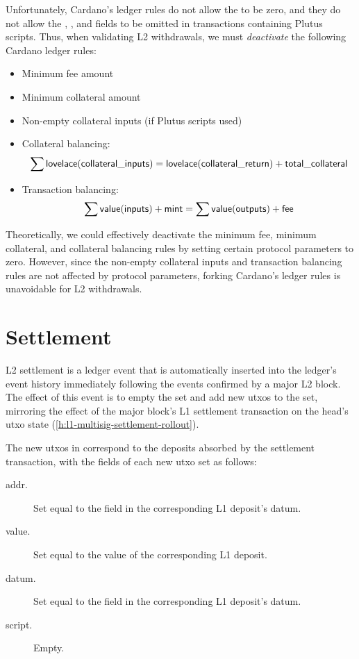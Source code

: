 \documentclass[../hydrozoa.tex]{subfiles}
\begin{document}
Unfortunately, Cardano's ledger rules do not allow the  to be zero, and they do not allow the , , and  fields to be omitted in transactions containing Plutus scripts.
Thus, when validating L2 withdrawals, we must \emph{deactivate} the following Cardano ledger rules:
\begin{itemize}
  \item Minimum fee amount
  \item Minimum collateral amount
  \item Non-empty collateral inputs (if Plutus scripts used)
  \item Collateral balancing:
    \begin{equation*}
      \sum \mathsf{lovelace} (\mathsf{collateral\_inputs}) =
      \mathsf{lovelace} (\mathsf{collateral\_return}) + \mathsf{total\_collateral}
    \end{equation*}
  \item Transaction balancing:
    \begin{equation*}
      \sum \mathsf{value} (\mathsf{inputs}) + \mathsf{mint} =
      \sum \mathsf{value} (\mathsf{outputs}) + \mathsf{fee}
    \end{equation*}
\end{itemize}

Theoretically, we could effectively deactivate the minimum fee, minimum collateral, and collateral balancing rules by setting certain protocol parameters to zero.
However, since the non-empty collateral inputs and transaction balancing rules are not affected by protocol parameters, forking Cardano's ledger rules is unavoidable for L2 withdrawals.

\section{Settlement}%
\label{h:ledger-settlement}%

L2 settlement is a ledger event that is automatically inserted into the ledger's event history immediately following the events confirmed by a major L2 block.
The effect of this event is to empty the  set and add new utxos to the  set, mirroring the effect of the major block's L1 settlement transaction on the head's utxo state (\cref{h:l1-multisig-settlement-rollout}).

The new utxos in  correspond to the deposits absorbed by the settlement transaction, with the  fields of each new utxo set as follows:
\begin{description}
  \item[addr.] Set equal to the  field in the corresponding L1 deposit's datum.
  \item[value.] Set equal to the value of the corresponding L1 deposit.
  \item[datum.] Set equal to the  field in the corresponding L1 deposit's datum.
  \item[script.] Empty.
\end{description}
\end{document}
